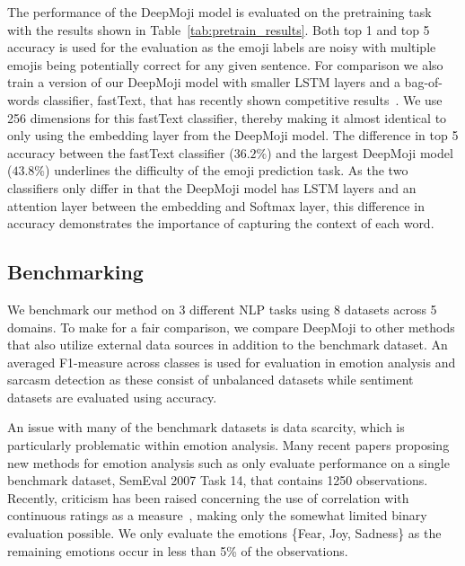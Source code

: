 \documentclass[11pt,a4paper]{article}
\newcommand{\ndsets}{8}
\newcommand{\ndomains}{5}
\begin{document}
The performance of the DeepMoji model is evaluated on the pretraining task with the results shown in Table~\ref{tab:pretrain_results}. Both top 1 and top 5 accuracy is used for the evaluation as the emoji labels are noisy with multiple emojis being potentially correct for any given sentence. For comparison we also train a version of our DeepMoji model with smaller LSTM layers and a bag-of-words classifier, fastText, that has recently shown competitive results~\cite{joulin2016bag}. We use 256 dimensions for this fastText classifier, thereby making it almost identical to only using the embedding layer from the DeepMoji model. The difference in top 5 accuracy between the fastText classifier ($36.2\%$) and the largest DeepMoji model ($43.8\%$) underlines the difficulty of the emoji prediction task. As the two classifiers only differ in that the DeepMoji model has LSTM layers and an attention layer between the embedding and Softmax layer, this difference in accuracy demonstrates the importance of capturing the context of each word. 

\subsection{Benchmarking}
\label{sub_sec:benchmarking}

We benchmark our method on 3 different NLP tasks using \ndsets{} datasets across \ndomains{} domains. To make for a fair comparison, we compare DeepMoji to other methods that also utilize external data sources in addition to the benchmark dataset. An averaged F1-measure across classes is used for evaluation in emotion analysis and sarcasm detection as these consist of unbalanced datasets while sentiment datasets are evaluated using accuracy.

An issue with many of the benchmark datasets is data scarcity, which is particularly problematic within emotion analysis. Many recent papers proposing new methods for emotion analysis such as \cite{staiano2014depechemood} only evaluate performance on a single benchmark dataset, SemEval 2007 Task 14, that contains 1250 observations. Recently, criticism has been raised concerning the use of correlation with continuous ratings as a measure~\cite{sven_emotions}, making only the somewhat limited binary evaluation possible. We only evaluate the emotions \{Fear, Joy, Sadness\} as the remaining emotions occur in less than 5\% of the observations.
\end{document}
